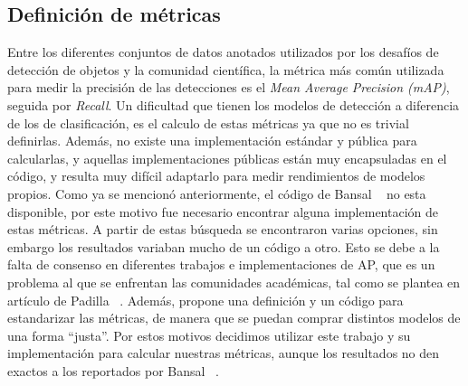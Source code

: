 \subsection{Definición de métricas} \label{ssec:definiciondemetricas}
Entre los diferentes conjuntos de datos anotados utilizados por los desafíos de detección de objetos y la comunidad científica, la métrica más común utilizada para medir la precisión de las detecciones es el  \textit{Mean Average Precision (mAP)}, seguida por \textit{Recall}. Un dificultad que tienen los modelos de detección a diferencia de los de clasificación, es el calculo de estas métricas ya que no es trivial definirlas. Además, no existe una implementación estándar y pública para calcularlas, y aquellas implementaciones públicas están muy encapsuladas en el código, y resulta muy difícil adaptarlo para medir rendimientos de modelos propios. Como ya se mencionó anteriormente, el código de Bansal \etal~\cite{bansal2018zero} no esta disponible, por este motivo fue necesario encontrar alguna implementación de estas métricas. A partir de estas búsqueda se encontraron varias opciones, sin embargo los resultados variaban mucho de un código a otro. Esto se debe a la falta de consenso en diferentes trabajos e implementaciones de AP, que es un problema al que se enfrentan las comunidades académicas, tal como se plantea en artículo de Padilla \etal~\cite{padilla2020survey}. Además, \cite{padilla2020survey} propone una definición y un código para estandarizar las métricas, de manera que se puedan comprar distintos modelos de una forma ``justa''. Por estos motivos decidimos utilizar este trabajo y su implementación para calcular nuestras métricas, aunque los resultados no den exactos a los reportados por Bansal \etal~\cite{bansal2018zero}.\\

